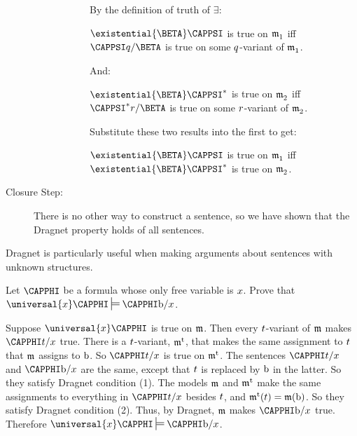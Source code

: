 \begin{PROOF}
\begin{description}
\begin{description}
\begin{description}
	By the definition of truth of $\exists$:

	\begin{center}
		$\existential{\BETA}\CAPPSI$ is true on $\mathfrak{m^{\mathrm{}}_{\mathrm{1}}}$ iff
		$\CAPPSI\variable{q}/\BETA$ is true on some $q$-variant of $\mathfrak{m^{\mathrm{}}_{\mathrm{1}}}$.
	\end{center}

	And:

	\begin{center}
		$\existential{\BETA}\CAPPSI^*$ is true on $\mathfrak{m^{\mathrm{}}_{\mathrm{2}}}$ iff
		$\CAPPSI^*\variable{r}/\BETA$ is true on some $r$-variant of $\mathfrak{m^{\mathrm{}}_{\mathrm{2}}}$.
	\end{center}

	Substitute these two results into the first to get:

	\begin{center}
		$\existential{\BETA}\CAPPSI$ is true on $\mathfrak{m^{\mathrm{}}_{\mathrm{1}}}$
		iff $\existential{\BETA}\CAPPSI^*$ is true on $\mathfrak{m^{\mathrm{}}_{\mathrm{2}}}$.
	\end{center}

\end{description}

\end{description}

\item[Closure Step:] There is no other way to construct a \GQL{} sentence, so we have shown that the Dragnet property holds of all \GQL{} sentences.
\end{description}
\end{PROOF}

Dragnet is particularly useful when making arguments about sentences with unknown structures.

\begin{majorILnc}{}
Let $\CAPPHI$ be a formula whose only free variable is $x$.
Prove that $\universal{\variable{x}}\CAPPHI\sdtstile{}{}\CAPPHI\constant{b}/\variable{x}$.  
\end{majorILnc} 
 
\begin{PROOF}
Suppose $\universal{\variable{x}}\CAPPHI$ is true on $\mathfrak{m}$. 
Then every $t$-variant of $\mathfrak{m}$ makes $\CAPPHI\variable{t}/\variable{x}$ true.
There is a $t$-variant, $\mathfrak{m^{\mathrm{t}}_{\mathrm{}}}$, that makes the same assignment to $t$ that $\mathfrak{m}$ assigns to $\mathrm{b}$.
So $\CAPPHI\variable{t}/\variable{x}$ is true on $\mathfrak{m^{\mathrm{t}}_{\mathrm{}}}$.
The sentences $\CAPPHI\variable{t}/\variable{x}$ and $\CAPPHI\constant{b}/\variable{x}$ are the same, except that $t$ is replaced by $\mathrm{b}$ in the latter.
So they satisfy Dragnet condition (1).
The models $\mathfrak{m}$ and $\mathfrak{m^{\mathrm{t}}_{\mathrm{}}}$ make the same assignments to everything in $\CAPPHI\variable{t}/\variable{x}$ besides $t$, and $\mathfrak{m^{\mathrm{t}}_{\mathrm{}}}(t)=\mathfrak{m}(\mathrm{b})$.
So they satisfy Dragnet condition (2).
Thus, by Dragnet, $\mathfrak{m}$ makes $\CAPPHI\constant{b}/\variable{x}$ true.
Therefore $\universal{\variable{x}}\CAPPHI\sdtstile{}{}\CAPPHI\constant{b}/\variable{x}$.
\end{PROOF} 

